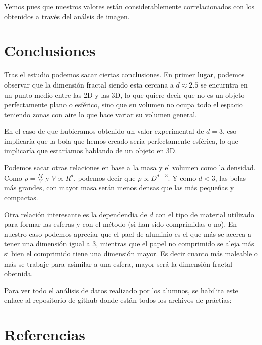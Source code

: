 \documentclass[11pt, a4paper, twocolumn]{article}
\begin{document}
Vemos pues que nuestros valores están considerablemente correlacionados con los obtenidos a través del análsis de imagen.
\section{Conclusiones}



Tras el estudio podemos sacar ciertas conclusiones. En primer lugar, podemos observar que la dimensión fractal siendo esta cercana a $d\approx 2.5$
se encurntra en un punto medio entre las 2D y las 3D, lo que quiere decir que no es un objeto perfectamente plano o esférico, sino que su volumen no 
ocupa todo el espacio teniendo zonas con aire lo que hace variar su volumen general. 


En el caso de que hubieramos obtenido un valor experimental de $d = 3$, eso implicaría que la bola que hemos creado sería perfectamente esférica, 
lo que implicaría que estaríamos hablando de un objeto en 3D. 

\vspace{0.5cm}
Podemos sacar otras relaciones en base a la masa y el volumen como la densidad. Como $\rho = \frac{M}{V}$ y $V \propto R^d$, 
podemos decir que $\rho \propto D^{d-3}$. Y como $d < 3$, las bolas más grandes, con mayor masa serán menos densas que las más 
pequeñas y compactas. 

\vspace{0.5cm}

Otra relación interesante es la dependendia de $d$ con el tipo de material utilizado para formar las esferas y con el método (si han sido comprimidas o no). 
En nuestro caso podemos apreciar que el pael de aluminio es el que más se acerca a tener una dimensión igual a 3, mientras que el papel no comprimido se aleja más
si bien el comprimido tiene una dimensión mayor. Es decir cuanto más maleable o más se trabaje para asimilar a una esfera, mayor será la dimensión fractal obetnida.

\vspace{1cm}
Para ver todo el análisis de datos realizado por los alumnos, se habilita este enlace al repositorio de github donde están todos los archivos de práctias: 
\cite{experimental32026}

\section{Referencias}

\nocite{gomes1987fractal}
\nocite{balankin2010fractal}
\nocite{cambou2011three}
\nocite{garcia2012bolas}

\printbibliography
\end{document}
